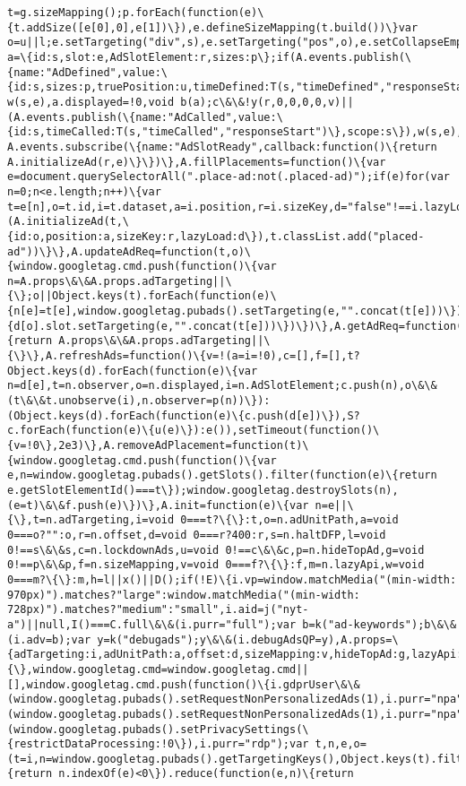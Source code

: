 \documentclass[11pt]{article}
\begin{document}
\begin{Verbatim}[commandchars=\\\{\}]
t=g.sizeMapping();p.forEach(function(e)\{t.addSize([e[0],0],e[1])\}),e.defineSizeMapping(t.build())\}var o=u||l;e.setTargeting("div",s),e.setTargeting("pos",o),e.setCollapseEmptyDiv(!0),e.addService(g.pubads());var a=\{id:s,slot:e,AdSlotElement:r,sizes:p\};if(A.events.publish(\{name:"AdDefined",value:\{id:s,sizes:p,truePosition:u,timeDefined:T(s,"timeDefined","responseStart"),slot:e\},scope:s\}),S)return w(s,e),a.displayed=!0,void b(a);c\&\&!y(r,0,0,0,0,v)||(A.events.publish(\{name:"AdCalled",value:\{id:s,timeCalled:T(s,"timeCalled","responseStart")\},scope:s\}),w(s,e),a.displayed=!0),b(a)\})\}\}else A.events.subscribe(\{name:"AdSlotReady",callback:function()\{return A.initializeAd(r,e)\}\})\},A.fillPlacements=function()\{var e=document.querySelectorAll(".place-ad:not(.placed-ad)");if(e)for(var n=0;n<e.length;n++)\{var t=e[n],o=t.id,i=t.dataset,a=i.position,r=i.sizeKey,d="false"!==i.lazyLoad;o\&\&a\&\&(A.initializeAd(t,\{id:o,position:a,sizeKey:r,lazyLoad:d\}),t.classList.add("placed-ad"))\}\},A.updateAdReq=function(t,o)\{window.googletag.cmd.push(function()\{var n=A.props\&\&A.props.adTargeting||\{\};o||Object.keys(t).forEach(function(e)\{n[e]=t[e],window.googletag.pubads().setTargeting(e,"".concat(t[e]))\}),d[o]\&\&Object.keys(t).forEach(function(e)\{d[o].slot.setTargeting(e,"".concat(t[e]))\})\})\},A.getAdReq=function()\{return A.props\&\&A.props.adTargeting||\{\}\},A.refreshAds=function()\{v=!(a=i=!0),c=[],f=[],t?Object.keys(d).forEach(function(e)\{var n=d[e],t=n.observer,o=n.displayed,i=n.AdSlotElement;c.push(n),o\&\&(t\&\&t.unobserve(i),n.observer=p(n))\}):(Object.keys(d).forEach(function(e)\{c.push(d[e])\}),S?c.forEach(function(e)\{u(e)\}):e()),setTimeout(function()\{v=!0\},2e3)\},A.removeAdPlacement=function(t)\{window.googletag.cmd.push(function()\{var e,n=window.googletag.pubads().getSlots().filter(function(e)\{return e.getSlotElementId()===t\});window.googletag.destroySlots(n),(e=t)\&\&f.push(e)\})\},A.init=function(e)\{var n=e||\{\},t=n.adTargeting,i=void 0===t?\{\}:t,o=n.adUnitPath,a=void 0===o?"":o,r=n.offset,d=void 0===r?400:r,s=n.haltDFP,l=void 0!==s\&\&s,c=n.lockdownAds,u=void 0!==c\&\&c,p=n.hideTopAd,g=void 0!==p\&\&p,f=n.sizeMapping,v=void 0===f?\{\}:f,m=n.lazyApi,w=void 0===m?\{\}:m,h=l||x()||D();if(!E)\{i.vp=window.matchMedia("(min-width: 970px)").matches?"large":window.matchMedia("(min-width: 728px)").matches?"medium":"small",i.aid=j("nyt-a")||null,I()===C.full\&\&(i.purr="full");var b=k("ad-keywords");b\&\&(i.adv=b);var y=k("debugads");y\&\&(i.debugAdsQP=y),A.props=\{adTargeting:i,adUnitPath:a,offset:d,sizeMapping:v,hideTopAd:g,lazyApi:w\},window.googletag=window.googletag||\{\},window.googletag.cmd=window.googletag.cmd||[],window.googletag.cmd.push(function()\{i.gdprUser\&\&(window.googletag.pubads().setRequestNonPersonalizedAds(1),i.purr="npa"),I()===C.nonPersonalized\&\&(window.googletag.pubads().setRequestNonPersonalizedAds(1),i.purr="npa"),I()===C.restrictedDataProcessing\&\&(window.googletag.pubads().setPrivacySettings(\{restrictDataProcessing:!0\}),i.purr="rdp");var t,n,e,o=(t=i,n=window.googletag.pubads().getTargetingKeys(),Object.keys(t).filter(function(e)\{return n.indexOf(e)<0\}).reduce(function(e,n)\{return 
\end{Verbatim}
\end{document}
